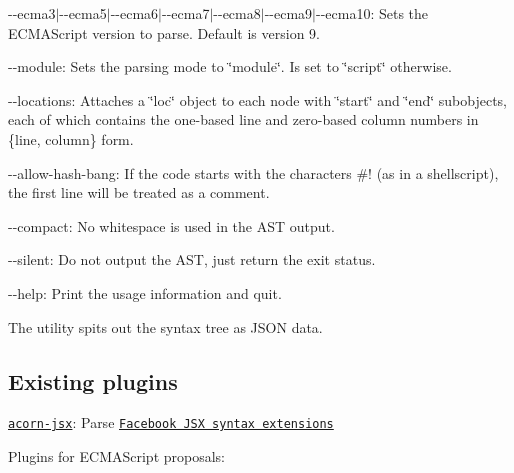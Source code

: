 \begin{DoxyItemize}
\item {\ttfamily -\/-\/ecma3$\vert$-\/-\/ecma5$\vert$-\/-\/ecma6$\vert$-\/-\/ecma7$\vert$-\/-\/ecma8$\vert$-\/-\/ecma9$\vert$-\/-\/ecma10}\+: Sets the E\+C\+M\+A\+Script version to parse. Default is version 9.
\item {\ttfamily -\/-\/module}\+: Sets the parsing mode to {\ttfamily \char`\"{}module\char`\"{}}. Is set to {\ttfamily \char`\"{}script\char`\"{}} otherwise.
\item {\ttfamily -\/-\/locations}\+: Attaches a \char`\"{}loc\char`\"{} object to each node with \char`\"{}start\char`\"{} and \char`\"{}end\char`\"{} subobjects, each of which contains the one-\/based line and zero-\/based column numbers in {\ttfamily \{line, column\}} form.
\item {\ttfamily -\/-\/allow-\/hash-\/bang}\+: If the code starts with the characters \#! (as in a shellscript), the first line will be treated as a comment.
\item {\ttfamily -\/-\/compact}\+: No whitespace is used in the A\+ST output.
\item {\ttfamily -\/-\/silent}\+: Do not output the A\+ST, just return the exit status.
\item {\ttfamily -\/-\/help}\+: Print the usage information and quit.
\end{DoxyItemize}

The utility spits out the syntax tree as J\+S\+ON data.

\subsection*{Existing plugins}


\begin{DoxyItemize}
\item \href{https://github.com/RReverser/acorn-jsx}{\tt {\ttfamily acorn-\/jsx}}\+: Parse \href{https://github.com/facebook/jsx}{\tt Facebook J\+SX syntax extensions}
\end{DoxyItemize}

Plugins for E\+C\+M\+A\+Script proposals\+:


